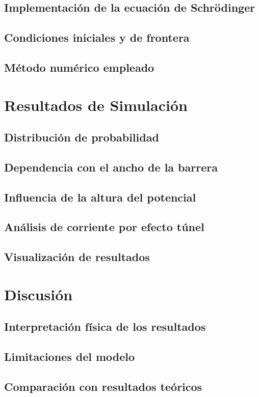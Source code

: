 \documentclass[12pt]{article}
\begin{document}
\subsection{Implementación de la ecuación de Schrödinger}
\subsection{Condiciones iniciales y de frontera}
\subsection{Método numérico empleado}

\section{Resultados de Simulación}
\subsection{Distribución de probabilidad}
\subsection{Dependencia con el ancho de la barrera}
\subsection{Influencia de la altura del potencial}
\subsection{Análisis de corriente por efecto túnel}
\subsection{Visualización de resultados}

\section{Discusión}
\subsection{Interpretación física de los resultados}
\subsection{Limitaciones del modelo}
\subsection{Comparación con resultados teóricos}
\end{document}
